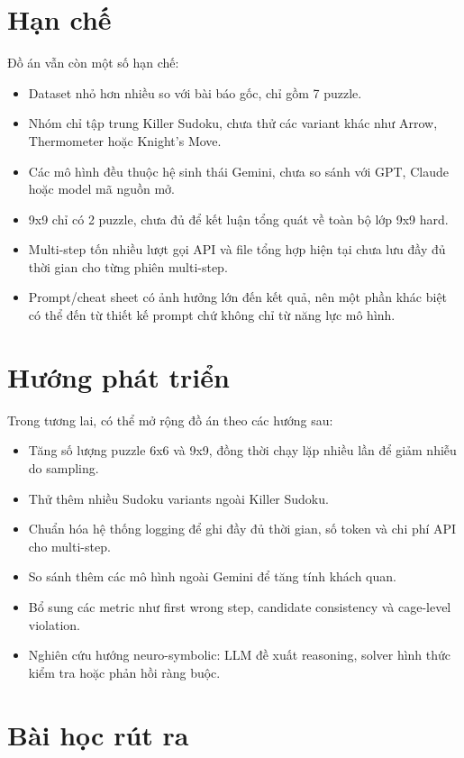 \documentclass[12pt,a4paper,oneside]{report}
\begin{document}
\section{Hạn chế}

Đồ án vẫn còn một số hạn chế:

\begin{itemize}
  \item Dataset nhỏ hơn nhiều so với bài báo gốc, chỉ gồm 7 puzzle.
  \item Nhóm chỉ tập trung Killer Sudoku, chưa thử các variant khác như Arrow, Thermometer hoặc Knight's Move.
  \item Các mô hình đều thuộc hệ sinh thái Gemini, chưa so sánh với GPT, Claude hoặc model mã nguồn mở.
  \item 9x9 chỉ có 2 puzzle, chưa đủ để kết luận tổng quát về toàn bộ lớp 9x9 hard.
  \item Multi-step tốn nhiều lượt gọi API và file tổng hợp hiện tại chưa lưu đầy đủ thời gian cho từng phiên multi-step.
  \item Prompt/cheat sheet có ảnh hưởng lớn đến kết quả, nên một phần khác biệt có thể đến từ thiết kế prompt chứ không chỉ từ năng lực mô hình.
\end{itemize}

\section{Hướng phát triển}

Trong tương lai, có thể mở rộng đồ án theo các hướng sau:

\begin{itemize}
  \item Tăng số lượng puzzle 6x6 và 9x9, đồng thời chạy lặp nhiều lần để giảm nhiễu do sampling.
  \item Thử thêm nhiều Sudoku variants ngoài Killer Sudoku.
  \item Chuẩn hóa hệ thống logging để ghi đầy đủ thời gian, số token và chi phí API cho multi-step.
  \item So sánh thêm các mô hình ngoài Gemini để tăng tính khách quan.
  \item Bổ sung các metric như first wrong step, candidate consistency và cage-level violation.
  \item Nghiên cứu hướng neuro-symbolic: LLM đề xuất reasoning, solver hình thức kiểm tra hoặc phản hồi ràng buộc.
\end{itemize}

\section{Bài học rút ra}
\end{document}
